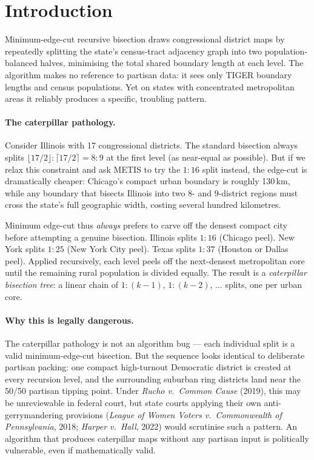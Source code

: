 \section{Introduction}
\label{sec:intro}

Minimum-edge-cut recursive bisection draws congressional district maps by
repeatedly splitting the state's census-tract adjacency graph into two
population-balanced halves, minimising the total shared boundary length at
each level.
The algorithm makes no reference to partisan data: it sees only TIGER
boundary lengths and census populations.
Yet on states with concentrated metropolitan areas it reliably produces
a specific, troubling pattern.

\paragraph{The caterpillar pathology.}
Consider Illinois with 17 congressional districts.
The standard bisection always splits $\lfloor 17/2 \rfloor : \lceil 17/2 \rceil = 8:9$ at
the first level (as near-equal as possible).
But if we relax this constraint and ask METIS to try the $1:16$ split instead,
the edge-cut is dramatically cheaper: Chicago's compact urban boundary is
roughly 130\,km, while any boundary that bisects Illinois into
two $8$- and $9$-district regions must cross the state's full geographic width,
costing several hundred kilometres.

Minimum edge-cut thus \emph{always} prefers to carve off the densest compact
city before attempting a genuine bisection.
Illinois splits $1:16$ (Chicago peel).
New York splits $1:25$ (New York City peel).
Texas splits $1:37$ (Houston or Dallas peel).
Applied recursively, each level peels off the next-densest metropolitan core
until the remaining rural population is divided equally.
The result is a \emph{caterpillar bisection tree}: a linear chain of
$1:(k-1)$, $1:(k-2)$, $\ldots$ splits, one per urban core.

\paragraph{Why this is legally dangerous.}
The caterpillar pathology is not an algorithm bug --- each individual split
is a valid minimum-edge-cut bisection.
But the sequence looks identical to deliberate partisan packing:
one compact high-turnout Democratic district is created at every recursion
level, and the surrounding suburban ring districts land near the 50/50
partisan tipping point.
Under \emph{Rucho v.\ Common Cause} (2019), this may be unreviewable in
federal court, but state courts applying their own anti-gerrymandering
provisions (\emph{League of Women Voters v.\ Commonwealth of Pennsylvania}, 2018;
\emph{Harper v.\ Hall}, 2022) would scrutinise such a pattern.
An algorithm that produces caterpillar maps without any partisan input is
politically vulnerable, even if mathematically valid.

